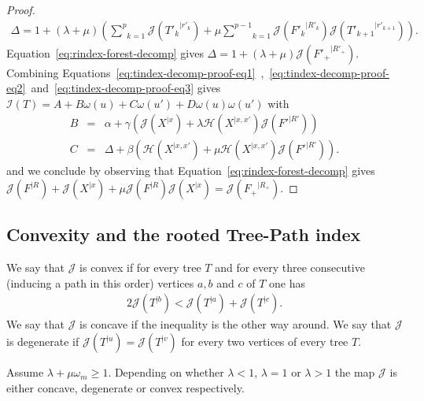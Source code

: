 \documentclass[11 pt]{modarticle}
\newcommand{\wmap}{\omega}
\newcommand{\wmin}{\omega_m}
\newcommand{\rtree}[2]{{#1}^{\lvert #2}}
\newcommand{\indexsymbol}{\mathcal{I}}
\newcommand{\tindex}[1]{\indexsymbol(#1)}
\newcommand{\rindexsymbol}{\mathcal{J}}
\newcommand{\rindex}[2]{\rindexsymbol(\rtree{#2}{#1})}
\newcommand{\aindexsymbol}{\mathcal{H}}
\newcommand{\aindex}[3]{\aindexsymbol(\rtree{#3}{#1, #2})}
\begin{document}
\begin{proof}
\begin{eqnarray*}
	\Delta = 1 + (\lambda + \mu) \left(\underset{k=1}{\overset{p}{\sum}} \rindex{r'_k}{T'_k} + \mu \underset{k=1}{\overset{p-1}{\sum}} \rindex{R'_k}{F'_k} \rindex{r'_{k+1}}{T'_{k+1}}\right).
\end{eqnarray*}
Equation~\eqref{eq:rindex-forest-decomp} gives $\Delta = 1 + (\lambda + \mu) \rindex{R'_+}{F'_+}$. Combining Equations~\eqref{eq:tindex-decomp-proof-eq1}~,~\eqref{eq:tindex-decomp-proof-eq2}~and~\eqref{eq:tindex-decomp-proof-eq3} gives $\tindex{T} = A + B \wmap(u) + C \wmap(u') + D \wmap(u) \wmap(u')$ with
\begin{eqnarray*}
	B & = & \alpha + \gamma\left(\rindex{x}{X} + \lambda \aindex{x}{x'}{X} \rindex{R'}{F'}\right) \\
	C & = &  \Delta + \beta\left(\aindex{x}{x'}{X} + \mu \aindex{x}{x'}{X} \rindex{R'}{F'}\right).
\end{eqnarray*}
and we conclude by observing that Equation~\eqref{eq:rindex-forest-decomp} gives $\rindex{R}{F} + \rindex{x}{X} + \mu \rindex{R}{F} \rindex{x}{X} = \rindex{R_+}{F_+}$.
\end{proof}


\subsection{Convexity and the rooted Tree-Path index}

\begin{defi}
We say that $\rindexsymbol$ is convex if for every tree $T$ and for every three consecutive (inducing a path in this order) vertices $a,b$ and $c$ of $T$ one has
\begin{eqnarray*}
	2 \rindex{b}{T} < \rindex{a}{T} + \rindex{c}{T}.
\end{eqnarray*}
We say that $\rindexsymbol$ is concave if the inequality is the other way around. We say that $\rindexsymbol$ is degenerate if $\rindex{u}{T} = \rindex{v}{T}$ for every two vertices of every tree $T$. 
\end{defi}

\begin{prop}\label{prop:convexity}
Assume $\lambda + \mu \wmin \geq 1$. Depending on whether $\lambda < 1$, $\lambda = 1$ or $\lambda > 1$ the map $\rindexsymbol$ is either concave, degenerate or convex respectively.
\end{prop}
\end{document}
